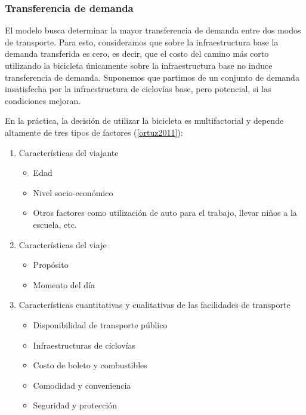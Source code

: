 \documentclass{article}
\begin{document}
  \subsubsection*{Transferencia de demanda}

  El modelo busca determinar la mayor transferencia de demanda entre dos modos de transporte. Para esto, consideramos que sobre la infraestructura base la demanda transferida es cero, es decir, que el costo del camino más corto utilizando la bicicleta únicamente sobre la infraestructura base no induce transferencia de demanda. Suponemos que partimos de un conjunto de demanda insatisfecha por la infraestructura de ciclovías base, pero potencial, si las condiciones mejoran.

  En la práctica, la decisión de utilizar la bicicleta es multifactorial y depende altamente de tres tipos de factores (\ref{ortuz2011}):

  \begin{enumerate}
    \item{
        Características del viajante
          \begin{itemize}
            \item{Edad}
            \item{Nivel socio-económico}
            \item{Otros factores como utilización de auto para el trabajo, llevar niños a la escuela, etc.}
          \end{itemize}
    }
    \item{
        Características del viaje
          \begin{itemize}
            \item{Propósito}
            \item{Momento del día}
          \end{itemize}
    }
    \item{
        Características cuantitativas y cualitativas de las facilidades de transporte
        \begin{itemize}
            \item{Disponibilidad de transporte público}
            \item{Infraestructuras de ciclovías}
            \item{Costo de boleto y combustibles}
            \item{Comodidad y conveniencia}
            \item{Seguridad y protección}
        \end{itemize}
    }
  \end{enumerate}
\end{document}

